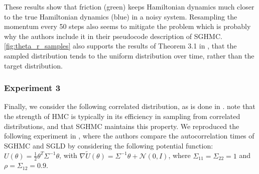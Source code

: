 These results show that friction (green) keeps Hamiltonian dynamics much closer to the true Hamiltonian dynamics (blue) in a noisy system. Resampling the momentum every 50 steps also seems to mitigate the problem which is probably why the authors \citeauthor{sghmc} include it in their pseudocode description of SGHMC. \cref{fig:theta_r_samples} also supports the results of Theorem 3.1 in \cite{sghmc}, that the sampled distribution tends to the uniform distribution over time, rather than the target distribution.
\subsubsection*{Experiment 3}
Finally, we consider the following correlated distribution, as is done in \cite{sghmc}. \citeauthor{sghmc} note that the strength of HMC is typically in its efficiency in sampling from correlated distributions, and that SGHMC maintains this property. We reproduced the following experiment in \cite{sghmc}, where the authors \citeauthor{sghmc} compare the autocorrelation times of SGHMC and SGLD by considering the following potential function: $U(\theta)=\frac{1}{2}\theta^T\Sigma^{-1}\theta$, with $\nabla \widetilde{U}(\theta) = \Sigma^{-1}\theta + \mathcal{N}(0,I)$, where $\Sigma_{11} = \Sigma_{22} = 1$ and $\rho = \Sigma_{12} = 0.9$.  

